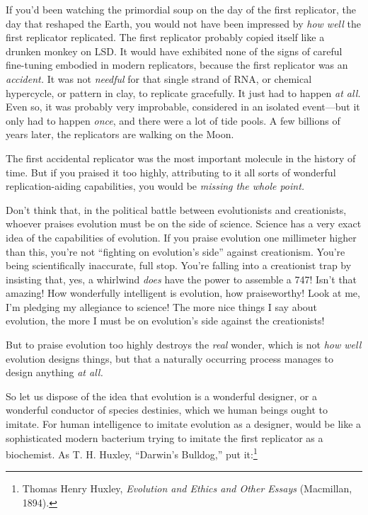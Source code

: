 {
 If you'd been watching the primordial soup on the
day of the first replicator, the day that reshaped the Earth, you would
not have been impressed by \textit{how well} the first replicator
replicated. The first replicator probably copied itself like a drunken
monkey on LSD. It would have exhibited none of the signs of careful
fine-tuning embodied in modern replicators, because the first
replicator was an \textit{accident.} It was not \textit{needful} for
that single strand of RNA, or chemical hypercycle, or pattern in clay,
to replicate gracefully. It just had to happen \textit{at all.} Even
so, it was probably very improbable, considered in an isolated
event---but it only had to happen \textit{once}, and there were a lot
of tide pools. A few billions of years later, the replicators are
walking on the Moon.}

{
 The first accidental replicator was the most important molecule in
the history of time. But if you praised it too highly, attributing to
it all sorts of wonderful replication-aiding capabilities, you would be
\textit{missing the whole point.}}

{
 Don't think that, in the political battle between
evolutionists and creationists, whoever praises evolution must be on
the side of science. Science has a very exact idea of the capabilities
of evolution. If you praise evolution one millimeter higher than this,
you're not ``fighting on
evolution's side'' against
creationism. You're being scientifically inaccurate,
full stop. You're falling into a creationist trap by
insisting that, yes, a whirlwind \textit{does} have the power to
assemble a 747! Isn't that amazing! How wonderfully
intelligent is evolution, how praiseworthy! Look at me,
I'm pledging my allegiance to science! The more nice
things I say about evolution, the more I must be on
evolution's side against the creationists!}

{
 But to praise evolution too highly destroys the \textit{real}
wonder, which is not \textit{how well} evolution designs things, but
that a naturally occurring process manages to design anything
\textit{at all.}}

{
 So let us dispose of the idea that evolution is a wonderful
designer, or a wonderful conductor of species destinies, which we human
beings ought to imitate. For human intelligence to imitate evolution as
a designer, would be like a sophisticated modern bacterium trying to
imitate the first replicator as a biochemist. As T. H. Huxley,
``Darwin's
Bulldog,'' put it:\footnote{Thomas Henry Huxley, \textit{Evolution and Ethics and Other
Essays} (Macmillan, 1894).}}

